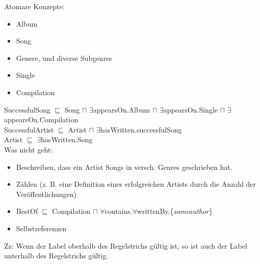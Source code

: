 
\newcommand{\defin}[2]{#1 $\sqsubseteq$ #2}
\newcommand{\ando}{$\sqcap$\hspace{1pt}}
\newcommand{\kripke}[1]{\ensuremath{\mathcal{#1}}}
\newcommand{\relation}[1]{\ensuremath{\mathcal{#1}}}

Atomare Konzepte:
\begin{itemize}
	\item Album
	\item Song
	\item Genere, und diverse Subgenres
	\item Single
	\item Compilation
\end{itemize}

SuccessfulSong $\sqsubseteq$ Song 	$\sqcap$ $\exists$\hspace{1pt}appearsOn.Album
									$\sqcap$ $\exists$\hspace{1pt}appearsOn.Single
									$\sqcap$
									$\exists$\hspace{1pt}appearsOn.Compilation\\

SuccessfulArtist $\sqsubseteq$ Artist $\sqcap$
$\exists$\hspace{1pt}hasWritten.successfulSong\\

Artist $\sqsubseteq$ $\exists$\hspace{1pt}hasWritten.Song\\

Was nicht geht:
\begin{itemize}
	\item Beschreiben, dass ein Artist Songs in versch. Genres geschrieben hat.
	\item Zählen (z. B. eine Definition eines erfolgreichen Artists durch die
		Anzahl der Veröffentlichungen)
	\item \defin{BestOf}{Compilation \ando
		$\forall$contains.$\forall$writtenBy.\{\textit{sameauthor}\}}
	\item Selbstreferenzen
\end{itemize}


Zz: Wenn der Label oberhalb des Regelstrichs gültig ist, so ist auch der Label
unterhalb des Regelstrichs gültig.



